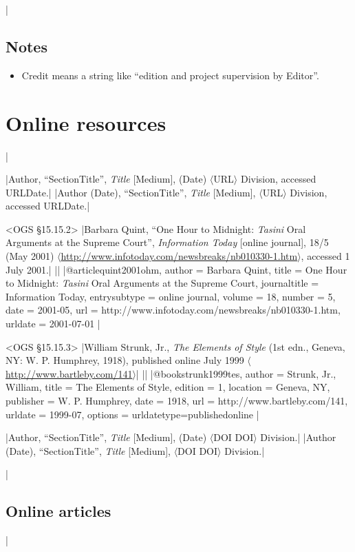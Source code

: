 \documentclass[extrafontsizes,11pt,a4paper,oneside]{memoir}
\newcommand*{\lit}[1]{\textsf{#1}}
\begin{document}
\todoc|
\section{Notes}

\begin{itemize}
  \item Credit means a string like \enquote{edition and project supervision by Editor}.
\end{itemize}

\chapter{Online resources}\label{sec:electronic}
|

\specs
|Author, \enquote{SectionTitle}, \emph{Title} [Medium], (Date) $\langle$URL$\rangle$ Division, \lit{accessed} URLDate.|%
|Author (Date), \enquote{SectionTitle}, \emph{Title} [Medium], $\langle$URL$\rangle$ Division, \lit{accessed} URLDate.|

\bibexample<OGS \S15.15.2>
|Barbara Quint, \enquote{One Hour to Midnight: \emph{Tasini} Oral Arguments at the Supreme Court}, \emph{Information Today} [online journal], 18/5 (May 2001) $\langle$\url{http://www.infotoday.com/newsbreaks/nb010330-1.htm}$\rangle$, accessed 1 July 2001.|%
||%
|@article{quint2001ohm,
  author = {Barbara Quint},
  title = {One Hour to Midnight: \emph{Tasini} Oral Arguments at the Supreme Court},
  journaltitle = {Information Today},
  entrysubtype = {online journal},
  volume = {18},
  number = {5},
  date = {2001-05},
  url = {http://www.infotoday.com/newsbreaks/nb010330-1.htm},
  urldate = {2001-07-01}
}|

\bibexample<OGS \S15.15.3>
|William Strunk, Jr., \emph{The Elements of Style} (1st edn., Geneva, NY: W. P. Humphrey, 1918), published online July 1999 $\langle$\url{http://www.bartleby.com/141}$\rangle$|%
||%
|@book{strunk1999tes,
  author = {Strunk, Jr., William},
  title = {The Elements of Style},
  edition = {1},
  location = {Geneva, NY},
  publisher = {W. P. Humphrey},
  date = {1918},
  url = {http://www.bartleby.com/141},
  urldate = {1999-07},
  options = {urldatetype=published{\space}online}
}|

\specs
|Author, \enquote{SectionTitle}, \emph{Title} [Medium], (Date) $\langle$\lit{DOI} DOI$\rangle$ Division.|%
|Author (Date), \enquote{SectionTitle}, \emph{Title} [Medium], $\langle$\lit{DOI} DOI$\rangle$ Division.|

\todoc|
\section{Online articles}
|
\end{document}
